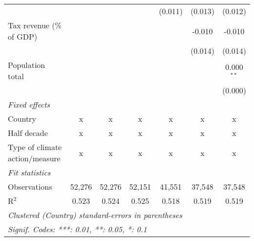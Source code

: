 \begin{tabular}{lcccccc}
                                                        &         &               &               & (0.011)        & (0.013)        & (0.012)\\   
   Tax revenue (\% of GDP)                              &         &               &               &                & -0.010         & -0.010\\   
                                                        &         &               &               &                & (0.014)        & (0.014)\\   
   Population total                                     &         &               &               &                &                & 0.000$^{**}$\\   
                                                        &         &               &               &                &                & (0.000)\\   
   \emph{Fixed effects}\\
   Country                                              & x       & x             & x             & x              & x              & x\\  
   Half decade                                          & x       & x             & x             & x              & x              & x\\  
   Type of climate action/measure                       & x       & x             & x             & x              & x              & x\\  
   \midrule \emph{Fit statistics}\\
   Observations                                         & 52,276  & 52,276        & 52,151        & 41,551         & 37,548         & 37,548\\  
   R$^2$                                                & 0.523   & 0.524         & 0.525         & 0.518          & 0.519          & 0.519\\  
   \midrule
   \multicolumn{7}{l}{\emph{Clustered (Country) standard-errors in parentheses}}\\
   \multicolumn{7}{l}{\emph{Signif. Codes: ***: 0.01, **: 0.05, *: 0.1}}\\
\end{tabular}
\par\endgroup


